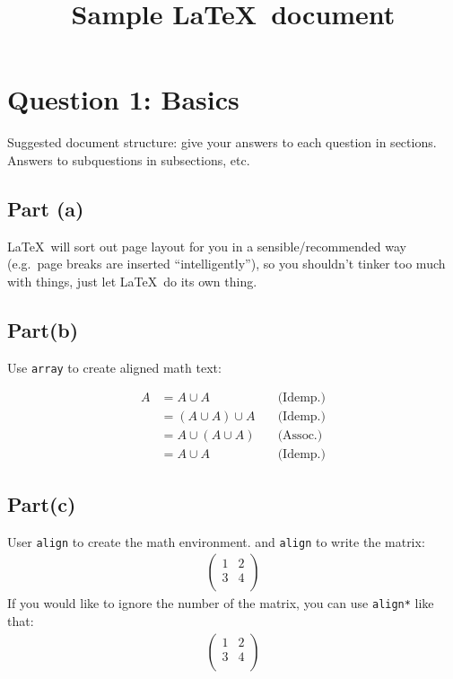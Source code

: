 \documentclass{article} %
\begin{document}
\title{Sample \LaTeX\ document}
\author{} %
\date{} %
\maketitle %

\section*{Question 1: Basics} %

Suggested document structure: give your answers to each question in sections.  Answers to subquestions in subsections, etc. 


\subsection*{Part (a)} %


\LaTeX\ will sort out page layout for you in a sensible/recommended way (e.g.\ page breaks are inserted ``intelligently''), so you shouldn't tinker too much with things, just let \LaTeX\ do its own thing.

\subsection*{Part(b)}
Use \texttt{array} to create aligned math text:

\[
\begin{array}{rlr} %
  A &= A \cup A &\quad\mbox{(Idemp.)} \\
  &= (A \cup A) \cup A & \quad\mbox{(Idemp.)}\\
  &= A \cup (A \cup A) & \quad\mbox{(Assoc.)}\\
  &= A \cup A & \quad\mbox{(Idemp.)}
\end{array}
\]
\subsection*{Part(c)}
User \texttt{align} to create the math environment. and \texttt{align} to write the matrix:
\begin{align}
\begin{pmatrix}
	1 & 2 \\
	3 & 4 \\
\end{pmatrix}
\end{align}
If you would like to ignore the number of the matrix, you can use \texttt{align*} like that:
\begin{align*}
\begin{pmatrix}
	1 & 2 \\
	3 & 4 \\
\end{pmatrix}
\end{align*}
\end{document}
